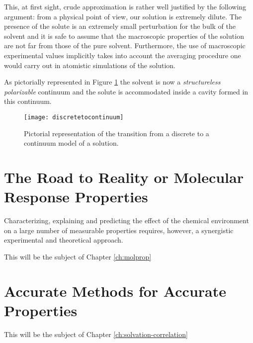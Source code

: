 This, at first sight, crude approximation is rather well justified by
the following argument: from a physical point of view, our solution is
extremely dilute. The presence of the solute is an extremely small
perturbation for the bulk of the solvent and it is safe to assume that
the macroscopic properties of the solution are not far from those of the
pure solvent. Furthermore, the use of macroscopic experimental values
implicitly takes into account the averaging procedure one would carry
out in atomistic simulations of the solution.

As pictorially represented in Figure \ref{fig:discretetocontinuum} the
solvent is now a \emph{structureless polarizable} continuum and the
solute is accommodated inside a cavity formed in this continuum.
\begin{figure}[!h]
 \centering
\texttt{[image: discretetocontinuum]}
\caption{Pictorial representation of the transition from a discrete to a
continuum model of a solution.}
\label{fig:discretetocontinuum}
\end{figure}

\section*{The Road to Reality or Molecular Response Properties}

Characterizing, explaining and predicting the effect of the chemical
environment on a large number of measurable properties requires,
however, a synergistic experimental and theoretical approach.

This will be the subject of Chapter \ref{ch:molprop}

\section*{Accurate Methods for Accurate Properties}

This will be the subject of Chapter \ref{ch:solvation-correlation}
